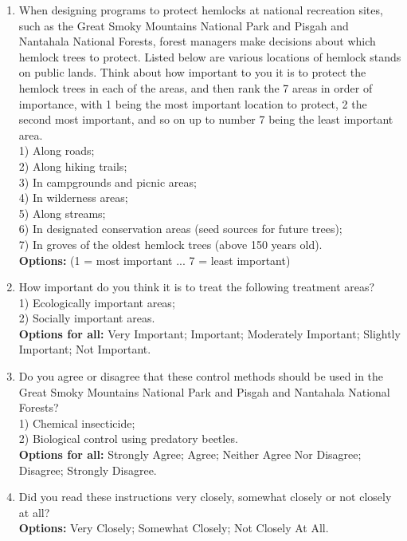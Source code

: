 \documentclass[12pt]{article}
\begin{document}
\begin{enumerate}[label=Q\arabic*., leftmargin=*]
    1) Great Smoky Mountains National Park; \\
    2) Pisgah National Forest; \\
    3) Nantahala National Forest. \\
    \textbf{Options:} (1 = most important ... 3 = least important)
    \item When designing programs to protect hemlocks at national recreation sites, such as the Great Smoky Mountains National Park and Pisgah and Nantahala National Forests, forest managers make decisions about which hemlock trees to protect. Listed below are various locations of  hemlock stands on public lands. Think about how important to you it is to protect the hemlock trees in each of the areas, and then rank the 7 areas in order of importance, with 1 being the most important location to protect, 2 the second most important, and so on up to number 7 being the least important area. \\
    1) Along roads; \\
    2) Along hiking trails; \\
    3) In campgrounds and picnic areas; \\
    4) In wilderness areas; \\
    5) Along streams; \\
    6) In designated conservation areas (seed sources for future trees); \\
    7) In groves of the oldest hemlock trees (above 150 years old). \\
    \textbf{Options:} (1 = most important  ...  7 = least important)
    \item How important do you think it is to treat the following treatment areas? \\
    1) Ecologically important areas; \\
    2) Socially important areas. \\
    \textbf{Options for all:} Very Important; Important; Moderately Important; Slightly Important; Not Important.
    \item Do you agree or disagree that these control methods should be used in the Great Smoky Mountains National Park and Pisgah and Nantahala National Forests? \\
    1) Chemical insecticide; \\
    2) Biological control using predatory beetles. \\
    \textbf{Options for all:} Strongly Agree; Agree; Neither Agree Nor Disagree; Disagree; Strongly Disagree.
    \item Did you read these instructions very closely, somewhat closely or not closely at all? \\
    \textbf{Options:} Very Closely; Somewhat Closely; Not Closely At All.
\end{enumerate}
\end{document}

